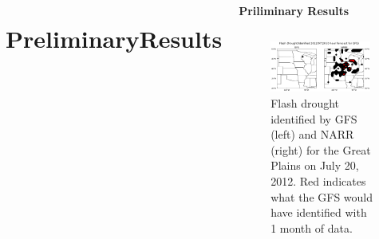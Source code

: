 \documentclass{beamer}
\begin{document}
\begin{frame}[t]{}
\begin{columns}[t]
		
			
			
			\section{PreliminaryResults} %
			
			\begin{creambox}
				\begin{block}{\bfseries Priliminary Results}
					\vspace*{-1.5cm} %
					\begin{columns}[t]
						\begin{figure}[htp]
							\captionsetup{width = 0.95\textwidth}
							\includegraphics[width = 0.95\textwidth, frame]{../Figures/Poster/Flash_Drought_Identified_20120720.png}
							\caption{\normalsize Flash drought identified by GFS (left) and NARR (right) for the Great Plains on July 20, 2012. Red indicates what the GFS would have identified with 1 month of data.}
						\end{figure}
					

\end{columns}
\end{block}
\end{creambox}
\end{columns}
\end{frame}
\end{document}
